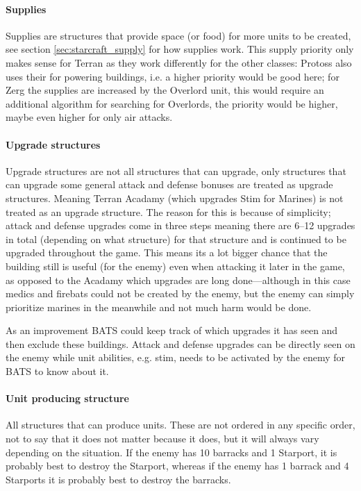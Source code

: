 \paragraph{Supplies \attackCoordinatorWeightsSupplyStructure}
Supplies are structures that provide space (or food) for more units to be created, see section \ref{sec:starcraft_supply} for how supplies work. This supply priority only makes sense for Terran as they work differently for the other classes: Protoss also uses their for powering buildings, i.e. a higher priority would be good here; for Zerg the supplies are increased by the Overlord unit, this would require an additional algorithm for searching for Overlords, the priority would be higher, maybe even higher for only air attacks.

\paragraph{Upgrade structures \attackCoordinatorWeightsUpgradeStructure}
Upgrade structures are not all structures that can upgrade, only structures that can upgrade some general attack and defense bonuses are treated as upgrade structures. Meaning Terran Acadamy (which upgrades Stim for Marines) is not treated as an upgrade structure. The reason for this is because of simplicity; attack and defense upgrades come in three steps meaning there are 6–12 upgrades in total (depending on what structure) for that structure and is continued to be upgraded throughout the game. This means its a lot bigger chance that the building still is useful (for the enemy) even when attacking it later in the game, as opposed to the Acadamy which upgrades are long done—although in this case medics and firebats could not be created by the enemy, but the enemy can simply prioritize marines in the meanwhile and not much harm would be done.

As an improvement BATS could keep track of which upgrades it has seen and then exclude these buildings. Attack and defense upgrades can be directly seen on the enemy while unit abilities, e.g. stim, needs to be activated by the enemy for BATS to know about it.

\paragraph{Unit producing structure \attackCoordinatorWeightsUnitProducingStructure}
All structures that can produce units. These are not ordered in any specific order, not to say that it does not matter because it does, but it will always vary depending on the situation. If the enemy has 10 barracks and 1 Starport, it is probably best to destroy the Starport, whereas if the enemy has 1 barrack and 4 Starports it is probably best to destroy the barracks.

